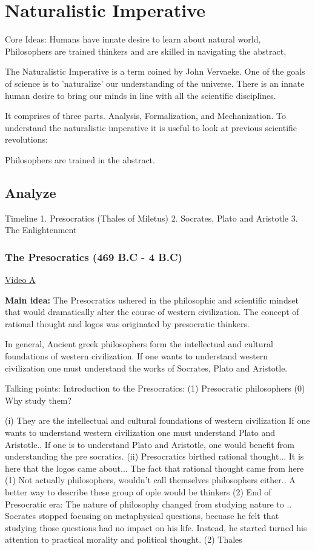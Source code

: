 \documentclass[twoside]{article}
\begin{document}
\section{Naturalistic Imperative}
Core Ideas: Humans have innate desire to learn about natural world, Philosophers
are trained thinkers and are skilled in navigating the abstract,

The Naturalistic Imperative is a term coined by John Vervaeke. One of the goals
of science is to 'naturalize' our understanding of the universe. There is an innate
human desire to bring our minds in line with all the scientific disciplines.

It comprises of three parts. Analysis, Formalization, and Mechanization. To understand
the naturalistic imperative it is useful to look at previous scientific revolutions:

Philosophers are trained in the abstract.

\subsection{Analyze}
Timeline
1. Presocratics (Thales of Miletus)
2. Socrates, Plato and Aristotle
3. The Enlightenment

\subsubsection{The Presocratics (469 B.C - 4 B.C)}


\href{https://www.youtube.com/watch?v=ZkMAx04jDx0}{Video A}

\textbf{Main idea:} The Presocratics ushered in the philosophic and scientific
mindset that would dramatically alter the course of western civilization.
The concept of rational thought and logos was originated by presocratic thinkers.

In general, Ancient greek philosophers form the intellectual and cultural foundations
of western civilization. If one wants to understand western civilization one must understand
the works of Socrates, Plato and Aristotle.


Talking points:
Introduction to the Presocratics:
(1) Presocratic philosophers
  (0) Why study them?

    (i) They are the intellectual and cultural foundations of western civilization
        If one wants to understand western civilization one must understand Plato
        and Aristotle.. If one is to understand Plato and Aristotle, one would
        benefit from understanding the pre socratics.
    (ii) Presocratics birthed rational thought... It is here that the logos
         came about... The fact that rational thought came from here
  (1) Not actually philosophers, wouldn't call themselves philosophers either..
      A better way to describe these group of ople would be thinkers
  (2) End of Presocratic era: The nature of philosophy changed from studying
  nature to .. Socrates stopped focusing on metaphysical questions, becuase
  he felt that studying those questions had no impact on his life. Instead, he started
  turned his attention to practical morality and political thought.
(2) Thales
\end{document}
